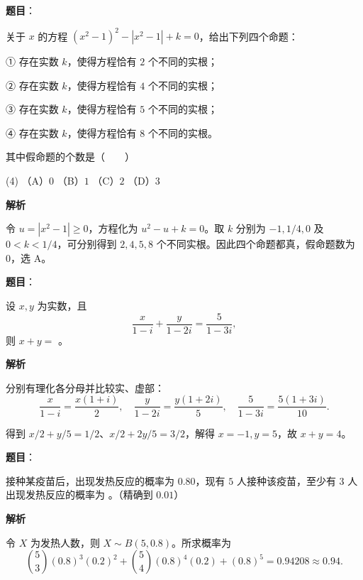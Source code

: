 \begin{answer}

\textbf{题目}：

关于 $x$ 的方程 $(x^2-1)^2-|x^2-1|+k=0$，给出下列四个命题：

① 存在实数 $k$，使得方程恰有 $2$ 个不同的实根；

② 存在实数 $k$，使得方程恰有 $4$ 个不同的实根；

③ 存在实数 $k$，使得方程恰有 $5$ 个不同的实根；

④ 存在实数 $k$，使得方程恰有 $8$ 个不同的实根。

其中假命题的个数是\mbox{（　　）}

\begin{gkopts}(4)
\task （A）$0$
\task （B）$1$
\task （C）$2$
\task （D）$3$
\end{gkopts}

\textbf{解析}

令 $u=|x^2-1|\ge0$，方程化为 $u^2-u+k=0$。取 $k$ 分别为 $-1,1/4,0$ 及 $0<k<1/4$，可分别得到 $2,4,5,8$ 个不同实根。因此四个命题都真，假命题数为 $0$，选 A。


\end{answer}
\begin{answer}

\textbf{题目}：

设 $x,y$ 为实数，且
\nopagebreak[4]
\[
\frac{x}{1-i}+\frac{y}{1-2i}=\frac{5}{1-3i},
\]
则 $x+y=$ \gkblank{}。

\textbf{解析}

分别有理化各分母并比较实、虚部：
\nopagebreak[4]
\[
\frac{x}{1-i}=\frac{x(1+i)}2,\quad
\frac{y}{1-2i}=\frac{y(1+2i)}5,\quad
\frac5{1-3i}=\frac{5(1+3i)}{10}.
\]

得到 $x/2+y/5=1/2$、$x/2+2y/5=3/2$，解得 $x=-1,y=5$，故 $x+y=4$。


\end{answer}
\begin{answer}

\textbf{题目}：

接种某疫苗后，出现发热反应的概率为 $0.80$，现有 $5$ 人接种该疫苗，至少有 $3$ 人出现发热反应的概率为 \gkblank{}。（精确到 $0.01$）

\textbf{解析}

令 $X$ 为发热人数，则 $X\sim B(5,0.8)$。所求概率为
\nopagebreak[4]
\[
\binom53(0.8)^3(0.2)^2+\binom54(0.8)^4(0.2)+(0.8)^5=0.94208\approx0.94.
\]


\end{answer}
